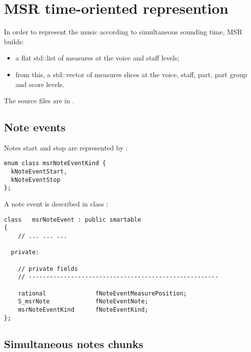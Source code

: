 
\chapter{MSR time-oriented represention}\label{MSR time-oriented represention}

In order to represent the music according to simultaneous sounding time, MSR builds:
\begin{itemize}
\item a flat std::list of measures at the voice and staff levels;
\item from this, a std::vector of measures slices at the voice, staff, part, part group and score levels.
\end{itemize}

The source files are in .


\section{Note events}

Notes start and stop are represented by :
\begin{lstlisting}[language=CPlusPlus]
enum class msrNoteEventKind {
  kNoteEventStart,
  kNoteEventStop
};
\end{lstlisting}

A note event is described in class   {\tt }:
\begin{lstlisting}[language=CPlusPlus]
class   msrNoteEvent : public smartable
{
	// ... ... ...

  private:

    // private fields
    // ------------------------------------------------------

    rational              fNoteEventMeasurePosition;
    S_msrNote             fNoteEventNote;
    msrNoteEventKind      fNoteEventKind;
};
\end{lstlisting}


\section{Simultaneous notes chunks}

